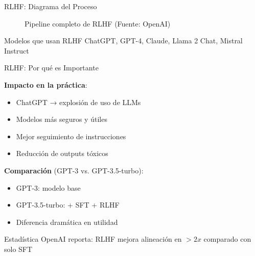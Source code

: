 \begin{frame}{RLHF: Diagrama del Proceso}

\begin{figure}
    \centering
    \caption{Pipeline completo de RLHF (Fuente: OpenAI)}
\end{figure}

\begin{block}{Modelos que usan RLHF}
ChatGPT, GPT-4, Claude, Llama 2 Chat, Mistral Instruct
\end{block}

\end{frame}

\begin{frame}{RLHF: Por qué es Importante}

\textbf{Impacto en la práctica}:
\begin{itemize}
    \item ChatGPT → explosión de uso de LLMs
    \item Modelos más seguros y útiles
    \item Mejor seguimiento de instrucciones
    \item Reducción de outputs tóxicos
\end{itemize}

\vspace{0.5em}

\textbf{Comparación} (GPT-3 vs. GPT-3.5-turbo):
\begin{itemize}
    \item GPT-3: modelo base
    \item GPT-3.5-turbo: + SFT + RLHF
    \item Diferencia dramática en utilidad
\end{itemize}

\vspace{0.5em}

\begin{exampleblock}{Estadística}
OpenAI reporta: RLHF mejora alineación en $>2x$ comparado con solo SFT
\end{exampleblock}

\end{frame}

